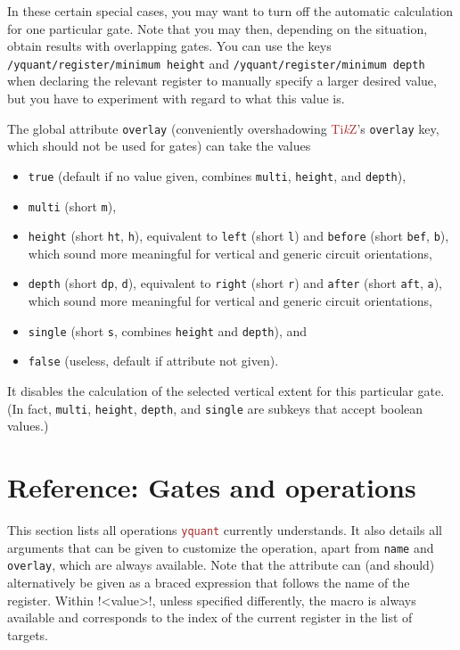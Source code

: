 \documentclass{scrartcl}
\makeatletter
\def\TikZ{\textcolor{brown}{Ti\textit kZ}}
\def\pkg#1{\textcolor{brown}{\texttt{#1}}}
\def\ttlink{\link\texttt}
\def\texlink{\link\tex}
\def\Yquant{\pkg{yquant}}
\newcommand*{\the@orig@section}{}
\let\the@orig@section=\section
\renewcommand*{\section}{%
   \clearpage%
   \the@orig@section%
}
\makeatother
\begin{document}
         In these certain special cases, you may want to turn off the automatic calculation for one particular gate.
         Note that you may then, depending on the situation, obtain results with overlapping gates.
         You can use the keys \ttlink{/yquant/register/minimum height} and \ttlink{/yquant/register/minimum depth} when declaring the relevant register to manually specify a larger desired value, but you have to experiment with regard to what this value is.

         The global attribute \texttt{overlay} (conveniently overshadowing \TikZ's \texttt{overlay} key, which should not be used for gates) can take the values
         \begin{itemize}
            \item \texttt{true} (default if no value given, combines \texttt{multi}, \texttt{height}, and \texttt{depth}),
            \item \texttt{multi} (short \texttt{m}),
            \item \texttt{height} (short \texttt{ht}, \texttt{h}), equivalent to \texttt{left} (short \texttt{l}) and \texttt{before} (short \texttt{bef}, \texttt{b}), which sound more meaningful for vertical and generic circuit orientations,
            \item \texttt{depth} (short \texttt{dp}, \texttt{d}), equivalent to \texttt{right} (short \texttt{r}) and \texttt{after} (short \texttt{aft}, \texttt{a}), which sound more meaningful for vertical and generic circuit orientations,
            \item \texttt{single} (short \texttt{s}, combines \texttt{height} and \texttt{depth}), and
            \item \texttt{false} (useless, default if attribute not given).
         \end{itemize}
         It disables the calculation of the selected vertical extent for this particular gate.
         (In fact, \texttt{multi}, \texttt{height}, \texttt{depth}, and \texttt{single} are subkeys that accept boolean values.)

   \section{Reference: Gates and operations}\label{sec:gates}
      This section lists all operations \Yquant{} currently understands.
      It also details all arguments that can be given to customize the operation, apart from \ttlink{name} and \ttlink{overlay}, which are always available.
      Note that the \texlink[value]{[value=<value>]} attribute can (and should) alternatively be given as a braced expression that follows the name of the register.
      Within \tex!<value>!, unless specified differently, the macro \texlink{\idx} is always available and corresponds to the index of the current register in the list of targets.
\end{document}
